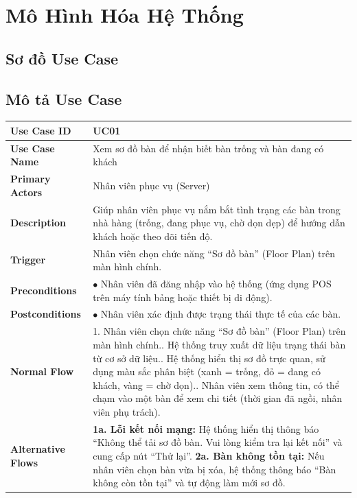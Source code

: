 \section{Mô Hình Hóa Hệ Thống}
\subsection{Sơ đồ Use Case}


\subsection{Mô tả Use Case}


\begin{longtable}{|p{3.5cm}|p{12.5cm}|}
\hline
\textbf{Use Case ID} & UC01 \\ \hline
\textbf{Use Case Name} & Xem sơ đồ bàn để nhận biết bàn trống và bàn đang có khách \\ \hline
\textbf{Primary Actors} & Nhân viên phục vụ (Server) \\ \hline
\textbf{Description} & Giúp nhân viên phục vụ nắm bắt tình trạng các bàn trong nhà hàng (trống, đang phục vụ, chờ dọn dẹp) để hướng dẫn khách hoặc theo dõi tiến độ. \\ \hline
\textbf{Trigger} & Nhân viên chọn chức năng ``Sơ đồ bàn'' (Floor Plan) trên màn hình chính. \\ \hline
\textbf{Preconditions} & $\bullet$ Nhân viên đã đăng nhập vào hệ thống (ứng dụng POS trên máy tính bảng hoặc thiết bị di động). \\ \hline
\textbf{Postconditions} & $\bullet$ Nhân viên xác định được trạng thái thực tế của các bàn. \\ \hline
\textbf{Normal Flow} &
1. Nhân viên chọn chức năng ``Sơ đồ bàn'' (Floor Plan) trên màn hình chính.\newline
2. Hệ thống truy xuất dữ liệu trạng thái bàn từ cơ sở dữ liệu.\newline
3. Hệ thống hiển thị sơ đồ trực quan, sử dụng màu sắc phân biệt (xanh = trống, đỏ = đang có khách, vàng = chờ dọn).\newline
4. Nhân viên xem thông tin, có thể chạm vào một bàn để xem chi tiết (thời gian đã ngồi, nhân viên phụ trách). \\ \hline
\textbf{Alternative Flows} &
\textbf{1a. Lỗi kết nối mạng:} Hệ thống hiển thị thông báo ``Không thể tải sơ đồ bàn. Vui lòng kiểm tra lại kết nối'' và cung cấp nút ``Thử lại''.\newline
\textbf{2a. Bàn không tồn tại:} Nếu nhân viên chọn bàn vừa bị xóa, hệ thống thông báo ``Bàn không còn tồn tại'' và tự động làm mới sơ đồ. \\ \hline
\end{longtable}



